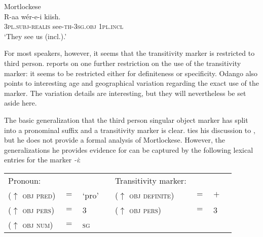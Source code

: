 \documentclass[output=paper,hidelinks]{langscibook}
\begin{document}
 \ea   \label{pakin3}Mortlockese\\
 \gll  R-aa w\'{e}r-e-i kiish.  \\
 \textsc{3pl.subj-realis} see-\textsc{th-3sg.obj}  \textsc{1pl.incl}  \\
 \glt `They see us (incl.).'
\z

 
 
 For most speakers, however, it seems that the transitivity marker is restricted to third person.  \citet{odango2014}    reports on one further restriction on the use of the transitivity marker: it seems to be restricted either for definiteness or specificity.  Odango also points to interesting age and geographical variation regarding the exact use of the marker. The variation details are interesting,   but they will nevertheless be set aside here. 
 
 The basic  generalization that the third person singular object marker has split into a pronominal suffix and a transitivity marker is clear.    \citet{odango2014}  ties his discussion  to   \citet{BM87}, but he does not provide a formal analysis of  Mortlockese.  However, the generalizations he provides evidence for can be captured by the   following  lexical entries for the   marker  \textit{-i}:   
 
   \ea \label{transitivity}\begin{tabular}[t]{llllllll }
{Pronoun:} &&&&{Transitivity marker:} &&& \\
($\uparrow$ \textsc{obj  pred}) & $=$ & `pro'  &  {\hspace{.2in} } &($\uparrow$ \textsc{obj definite}) & $=$ & $+$  \\
 ($\uparrow$ \textsc{obj  pers}) & $=$ &  3 &  {\hspace{.2in} } &($\uparrow$ \textsc{obj pers}) & $=$ &  3 \\ 
 ($\uparrow$ \textsc{obj  num}) & $=$ &  \textsc{sg}  &&  
 \end{tabular} 
 \z
 
\end{document}
